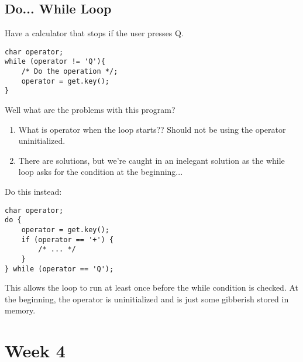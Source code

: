 \documentclass[12pt]{article}
\theoremstyle{definition}
\begin{document}
\subsection{Do... While Loop}
\idea Have a calculator that stops if the user presses Q. 
\begin{lstlisting}
char operator;
while (operator != 'Q'){
    /* Do the operation */;
    operator = get.key();
}
\end{lstlisting}
\qstn Well what are the problems with this program?
\begin{enumerate}
    \item What is operator when the loop starts?? Should not be using the operator uninitialized. 
    \item There are solutions, but we're caught in an inelegant solution as the while loop asks for the condition at the beginning...
\end{enumerate}
Do this instead:

\begin{lstlisting}
char operator;
do {
    operator = get.key();
    if (operator == '+') {
        /* ... */
    }
} while (operator == 'Q');   
\end{lstlisting}
This allows the loop to run at least once before the while condition is checked. 
\note At the beginning, the operator is uninitialized and is just some gibberish stored in memory. 

% 
\section{Week 4}
\end{document}

